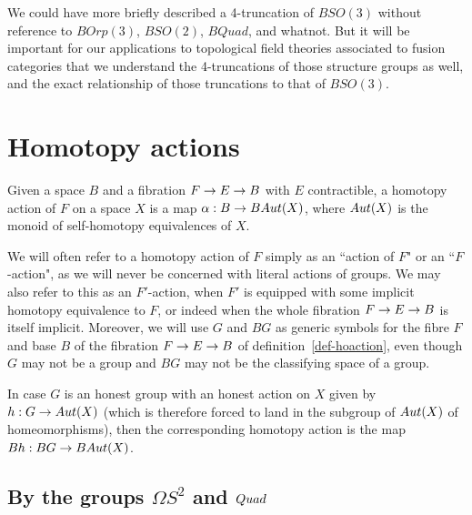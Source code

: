 \documentclass{amsart}
\begin{document}
We could have more briefly described a 4-truncation of $BSO(3)$ without reference to $BOrp(3)$, $BSO(2)$, $BQuad$, and whatnot.  But it will be important for our applications to topological field theories associated to fusion categories that we understand the 4-truncations of those structure groups as well, and the exact relationship of those truncations to that of $BSO(3)$.


\section{Homotopy actions}


\begin{definition} 
\label{def-hoaction}
Given a space $B$ and a fibration $F \rightarrow E \rightarrow B$ with $E$ contractible, a homotopy action of $F$ on a space $X$ is a map $\alpha: B \rightarrow BAut(X)$, where $Aut(X)$ is the monoid of self-homotopy equivalences of $X$.
\end{definition}
\nid We will often refer to a homotopy action of $F$ simply as an ``action of $F$" or an ``$F$-action", as we will never be concerned with literal actions of groups.  We may also refer to this as an $F'$-action, when $F'$ is equipped with some implicit homotopy equivalence to $F$, or indeed when the whole fibration $F \rightarrow E \rightarrow B$ is itself implicit.  Moreover, we will use $G$ and $BG$ as generic symbols for the fibre $F$ and base $B$ of the fibration $F \rightarrow E \rightarrow B$ of definition~\ref{def-hoaction}, even though $G$ may not be a group and $BG$ may not be the classifying space of a group.

In case $G$ is an honest group with an honest action on $X$ given by $h: G \rightarrow Aut(X)$ (which is therefore forced to land in the subgroup of $Aut(X)$ of homeomorphisms), then the corresponding homotopy action is the map $Bh: BG \rightarrow BAut(X)$.


\subsection{By the groups $\Omega S^2$ and $Quad$} \label{sec-quadaction}
\end{document}
